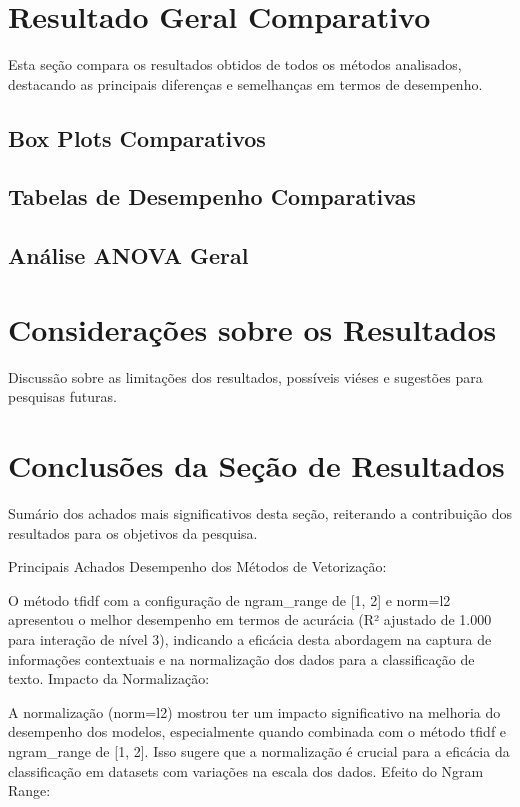 
\section{Resultado Geral Comparativo}
Esta seção compara os resultados obtidos de todos os métodos analisados, destacando as principais diferenças e semelhanças em termos de desempenho.

\subsection{Box Plots Comparativos}
\subsection{Tabelas de Desempenho Comparativas}
\subsection{Análise ANOVA Geral}

\section{Considerações sobre os Resultados}
Discussão sobre as limitações dos resultados, possíveis viéses e sugestões para pesquisas futuras.

\section{Conclusões da Seção de Resultados}
Sumário dos achados mais significativos desta seção, reiterando a contribuição dos resultados para os objetivos da pesquisa.

Principais Achados
Desempenho dos Métodos de Vetorização:

O método tfidf com a configuração de ngram_range de [1, 2] e norm=l2 apresentou o melhor desempenho em termos de acurácia (R² ajustado de 1.000 para interação de nível 3), indicando a eficácia desta abordagem na captura de informações contextuais e na normalização dos dados para a classificação de texto.
Impacto da Normalização:

A normalização (norm=l2) mostrou ter um impacto significativo na melhoria do desempenho dos modelos, especialmente quando combinada com o método tfidf e ngram_range de [1, 2]. Isso sugere que a normalização é crucial para a eficácia da classificação em datasets com variações na escala dos dados.
Efeito do Ngram Range:

